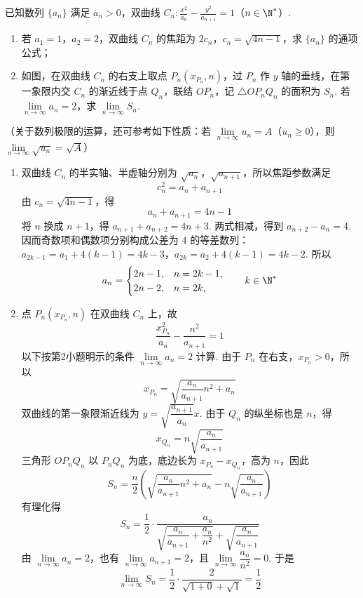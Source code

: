 \begin{problem}
已知数列 \(\{a_{n}\}\) 满足 \(a_{n}>0\)，双曲线 \(C_{n}:\frac{x^{2}}{a_{n}}-\frac{y^{2}}{a_{n+1}}=1\)（\(n\in\N^{*}\)）.

\begin{enumerate}
\item 若 \(a_{1}=1\)，\(a_{2}=2\)，双曲线 \(C_{n}\) 的焦距为 \(2c_{n}\)，\(c_{n}=\sqrt{4n-1}\)，求 \(\{a_{n}\}\) 的通项公式；
\item 如图，在双曲线 \(C_{n}\) 的右支上取点 \(P_{n}(x_{P_{n}},n)\)，过 \(P_{n}\) 作 \(y\) 轴的垂线，在第一象限内交 \(C_{n}\) 的渐近线于点 \(Q_{n}\)，联结 \(OP_{n}\)，记 \(\triangle OP_{n}Q_{n}\) 的面积为 \(S_{n}\). 若 \(\lim\limits_{n\to\infty}a_{n}=2\)，求 \(\lim\limits_{n\to\infty}S_{n}\).
\end{enumerate}

（关于数列极限的运算，还可参考如下性质：若 \(\lim\limits_{n\to\infty}u_{n}=A\)（\(u_{n}\ge0\)），则 \(\lim\limits_{n\to\infty}\sqrt{u_{n}}=\sqrt{A}\)）

\begingroup
\problemresetlayout
{}
\endgroup
\end{problem}

\begin{solution}
\begin{enumerate}
\item 双曲线 \(C_n\) 的半实轴、半虚轴分别为 \(\sqrt{a_n}\)，\(\sqrt{a_{n+1}}\)，所以焦距参数满足
\[
c_n^2=a_n+a_{n+1}
\]
由 \(c_n=\sqrt{4n-1}\)，得
\[
a_n+a_{n+1}=4n-1
\]
将 \(n\) 换成 \(n+1\)，得 \(a_{n+1}+a_{n+2}=4n+3\). 两式相减，得到 \(a_{n+2}-a_n=4\). 因而奇数项和偶数项分别构成公差为 \(4\) 的等差数列：
\(a_{2k-1}=a_1+4(k-1)=4k-3\)，\(a_{2k}=a_2+4(k-1)=4k-2\).
所以
\[
a_n=
\begin{cases}
2n-1,&n=2k-1,\\
2n-2,&n=2k,
\end{cases}
\qquad k\in\N^*
\]

\item 点 \(P_n(x_{P_n},n)\) 在双曲线 \(C_n\) 上，故
\[
\frac{x_{P_n}^2}{a_n}-\frac{n^2}{a_{n+1}}=1
\]
以下按第2小题明示的条件 \(\lim\limits_{n\to\infty}a_n=2\) 计算.
由于 \(P_n\) 在右支，\(x_{P_n}>0\)，所以
\[
x_{P_n}=\sqrt{\frac{a_n}{a_{n+1}}n^2+a_n}
\]
双曲线的第一象限渐近线为 \(y=\sqrt{\dfrac{a_{n+1}}{a_n}}x\). 由于 \(Q_n\) 的纵坐标也是 \(n\)，得
\[
x_{Q_n}=n\sqrt{\frac{a_n}{a_{n+1}}}
\]
三角形 \(OP_nQ_n\) 以 \(P_nQ_n\) 为底，底边长为 \(x_{P_n}-x_{Q_n}\)，高为 \(n\)，因此
\[
S_n=\frac n2\left(\sqrt{\frac{a_n}{a_{n+1}}n^2+a_n}-n\sqrt{\frac{a_n}{a_{n+1}}}\right)
\]
有理化得
\[
S_n=\frac12\cdot
\frac{a_n}{\sqrt{\dfrac{a_n}{a_{n+1}}+\dfrac{a_n}{n^2}}+\sqrt{\dfrac{a_n}{a_{n+1}}}}
\]
由 \(\lim\limits_{n\to\infty}a_n=2\)，也有 \(\lim\limits_{n\to\infty}a_{n+1}=2\)，且 \(\lim\limits_{n\to\infty}\dfrac{a_n}{n^2}=0\). 于是
\[
\lim\limits_{n\to\infty}S_n
=\frac12\cdot\frac{2}{\sqrt{1+0}+\sqrt1}
=\frac12
\]
\end{enumerate}
\end{solution}

